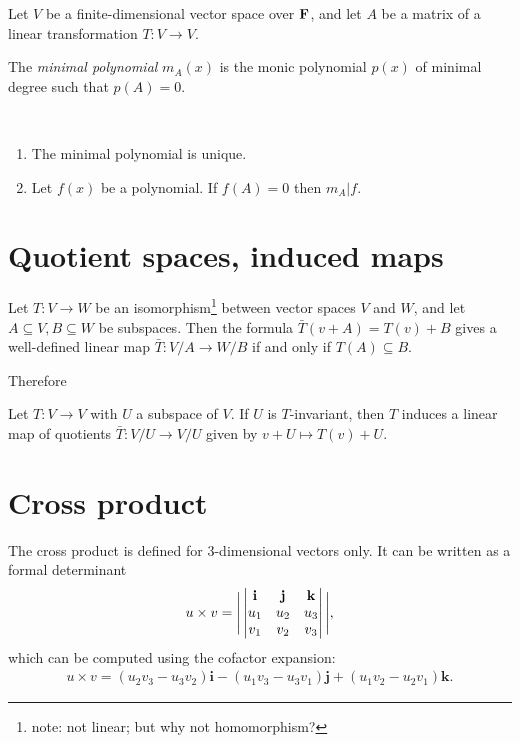 \begin{definition*}
  Let $V$ be a finite-dimensional vector space over $\mathbf{F}$, and let $A$ be a matrix of a linear
  transformation $T:V \to V$.

  The \emph{minimal polynomial} $m_A(x)$ is the monic polynomial $p(x)$ of minimal degree such that
  $p(A) = 0$.
\end{definition*}

\begin{theorem*}
  ~\\
  \begin{enumerate}
  \item The minimal polynomial is unique.
  \item Let $f(x)$ be a polynomial. If $f(A) = 0$ then $m_A | f$.
  \end{enumerate}
\end{theorem*}


\section{Quotient spaces, induced maps}

\begin{theorem*}
  Let $T:V \to W$ be an isomorphism\footnote{note: not linear; but why not homomorphism?} between
  vector spaces $V$ and $W$, and let $A \subseteq V, B \subseteq W$ be subspaces. Then the formula
  $\bar T(v + A) = T(v) + B$ gives a well-defined linear map $\bar T:V/A \to W/B$ if and only if
  $T(A) \subseteq B$.
\end{theorem*}

Therefore

\begin{theorem*}
  Let $T:V \to V$ with $U$ a subspace of $V$. If $U$ is $T$-invariant, then $T$ induces a linear
  map of quotients $\bar T:V/U \to V/U$ given by $v + U \mapsto T(v) + U$.
\end{theorem*}
\section{Cross product}
\begin{definition*}
  The cross product is defined for 3-dimensional vectors only. It can be written as a formal
  determinant
  \begin{align*}
    u \times v = \Bigg|
    \begin{vmatrix}\mathbf{i} & \mathbf{j} & \mathbf{k}\\u_1 & u_2 & u_3\\v_1 & v_2 & v_3\\ \end{vmatrix}
    \Bigg|,
  \end{align*}
  which can be computed using the cofactor expansion:
  \begin{align*}
    u \times v =
      (u_2v_3 - u_3v_2)\mathbf{i}
    - (u_1v_3 - u_3v_1)\mathbf{j}
    + (u_1v_2 - u_2v_1)\mathbf{k}.
  \end{align*}
\end{definition*}


